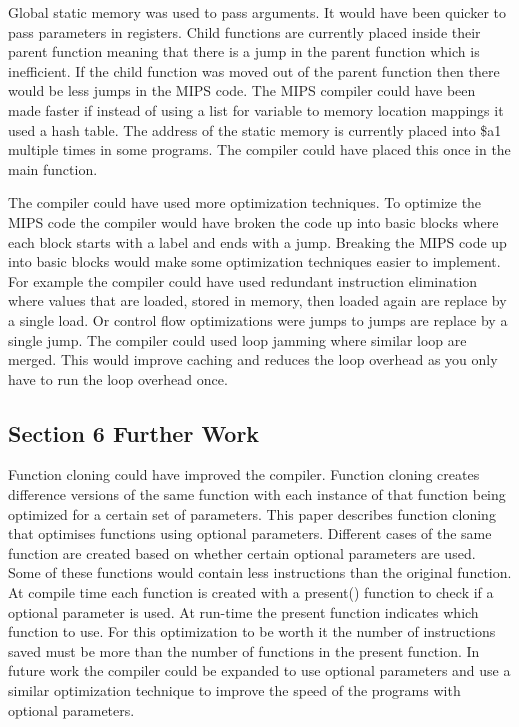 \documentclass{article}
\begin{document}
	Global static memory was used to pass arguments. It would have been quicker to pass parameters in registers. Child functions are currently placed inside their parent function meaning that there is a jump in the parent function which is inefficient. If the child function was moved out of the parent function then there would be less jumps in the MIPS code. The MIPS compiler could have been made faster if instead of using a list for variable to memory location mappings it used a hash table. The address of the static memory is currently placed into \$a1 multiple times in some programs. The compiler could have placed this once in the \textunderscore main function.
	
	The compiler could have used more optimization techniques. To optimize the MIPS code the compiler would have broken the code up into basic blocks where each block starts with a label and ends with a jump. Breaking the MIPS code up into basic blocks would make some optimization techniques easier to implement. For example the compiler could have used redundant instruction elimination where values that are loaded, stored in memory, then loaded again are replace by a single load. Or control flow optimizations were jumps to jumps are replace by a single jump. The compiler could used loop jamming where similar loop are merged. This would improve caching and reduces the loop overhead as you only have to run the loop overhead once. 
	
	\subsection{Section 6 Further Work}
	
	Function cloning could have improved the compiler. Function cloning creates difference versions of the same function with each instance of that function being optimized for a certain set of parameters. This paper\cite{functioncloning} describes function cloning that optimises functions using optional parameters. Different cases of the same function are created based on whether certain optional parameters are used. Some of these functions would contain less instructions than the original function. At compile time each function is created with a present() function to check if a optional parameter is used. At run-time the present function indicates which function to use. For this optimization to be worth it the number of instructions saved must be more than the number of functions in the present function. In future work the compiler could be expanded to use optional parameters and use a similar optimization technique to improve the speed of the programs with optional parameters.
	
\end{document}
